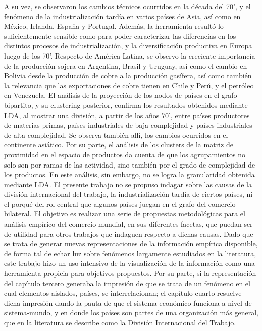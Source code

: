 \documentclass[class=article, crop=false]{standalone}
\begin{document}
A su vez, se observaron los cambios técnicos ocurridos en la década del 70', y el fenómeno de la industrialización tardía en varios países de Asia, así como en México, Irlanda, España y Portugal. Además, la herramienta resultó lo suficientemente sensible como para poder caracterizar las diferencias en los distintos procesos de industrialización, y la diversificación productiva en Europa luego de los 70'. Respecto de América Latina, se observo la creciente importancia de la producción sojera en Argentina, Brasil y Uruguay, así como el cambio en Bolivia desde la producción de cobre a la producción gasífera, así como también la relevancia que las exportaciones de cobre tienen en Chile y Perú, y el petróleo en Venezuela. El análisis de la proyección de los nodos de países en el grafo bipartito, y su clustering posterior, confirma los resultados obtenidos mediante LDA, al mostrar una división, a partir de los años 70', entre países productores de materias primas, países industriales de baja complejidad y países industriales de alta complejidad. Se observa también allí, los cambios ocurridos en el continente asiático. Por su parte, el análisis de los clusters de la matriz de proximidad en el espacio de productos da cuenta de que los agrupamientos no solo son por ramas de las actividad, sino también por el grado de complejidad de los productos. En este análisis, sin embargo, no se logra la granularidad obtenida mediante LDA. 
El presente trabajo no se propuso indagar sobre las causas de la división internacional del trabajo, la industrialización tardía de ciertos países, ni el porqué del rol central que algunos países juegan en el grafo del comercio bilateral. El objetivo es realizar una serie de propuestas metodológicas para el análisis empírico del comercio mundial, en sus diferentes facetas, que puedan ser de utilidad para otros trabajos que indaguen respecto a dichas causas. Dado que se trata de generar nuevas representaciones de la información empírica disponible, de forma tal de echar luz sobre fenómenos largamente estudiados en la literatura, este trabajo hizo un uso intensivo de la visualización de la información como una herramienta propicia para objetivos propuestos. Por su parte, si la representación del capítulo tercero generaba la impresión de que se trata de un fenómeno en el cual elementos aislados, países, se interrelacionan; el capítulo cuarto resuelve dicha impresión dando la pauta de que el sistema económico funciona a nivel de sistema-mundo, y en donde los países son partes de una organización más general, que en la literatura se describe como la División Internacional del Trabajo. 
\end{document}
